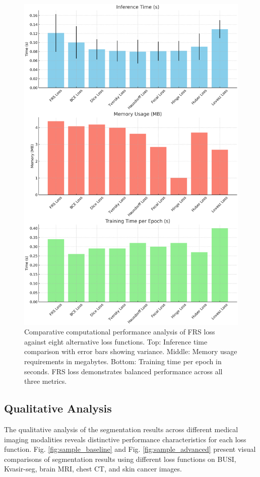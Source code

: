 \documentclass[review]{elsarticle}
\begin{document}
\begin{figure}[H]
	\centering
	\includegraphics[width=0.9\linewidth]{computational_analysis_results.png}
	\caption{Comparative computational performance analysis of FRS loss against eight alternative loss functions. Top: Inference time comparison with error bars showing variance. Middle: Memory usage requirements in megabytes. Bottom: Training time per epoch in seconds. FRS loss demonstrates balanced performance across all three metrics.}
    \label{fig:computational_results}
\end{figure}

\subsection{Qualitative Analysis}
The qualitative analysis of the segmentation results across different medical imaging modalities reveals distinctive performance characteristics for each loss function. Fig. \ref{fig:sample_baseline} and Fig. \ref{fig:sample_advanced} present visual comparisons of segmentation results using different loss functions on BUSI, Kvasir-seg, brain MRI, chest CT, and skin cancer images.
\end{document}

